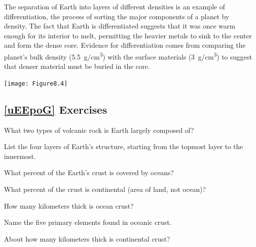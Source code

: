 \documentclass{article}
\numberwithin{equation}{section}
\numberwithin{figure}{section}
\begin{document}
\vspace{1em}

The separation of Earth into layers of different densities is an example of differentiation, the process of sorting the major components of a planet by density. The fact that Earth is differentiated suggests that it was once warm enough for its interior to melt, permitting the heavier metals to sink to the center and form the dense core. Evidence for differentiation comes from comparing the planet's bulk density (\SI{5.5}{g/cm^3}) with the surface materials (\SI{3}{g/cm^3}) to suggest that denser material must be buried in the core.

\begin{center}
    \texttt{[image: Figure8.4]}
\end{center}





\clearpage
\subsection*{\ref{uEEpoG} Exercises}

\begin{exercise} \label{qcvlSR}
    What two types of volcanic rock is Earth largely composed of?
\end{exercise}

\begin{exercise}
    List the four layers of Earth's structure, starting from the topmost layer to the innermost.
\end{exercise}

\begin{exercise}
    What percent of the Earth's crust is covered by oceans? 
\end{exercise}

\begin{exercise}
    What percent of the crust is continental (area of land, not ocean)?
\end{exercise}

\begin{exercise}
    How many kilometers thick is ocean crust?
\end{exercise}

\begin{exercise} \label{4pG09w}
    Name the five primary elements found in oceanic crust.
\end{exercise}

\begin{exercise}
    About how many kilometers thick is continental crust?
\end{exercise}
\end{document}
